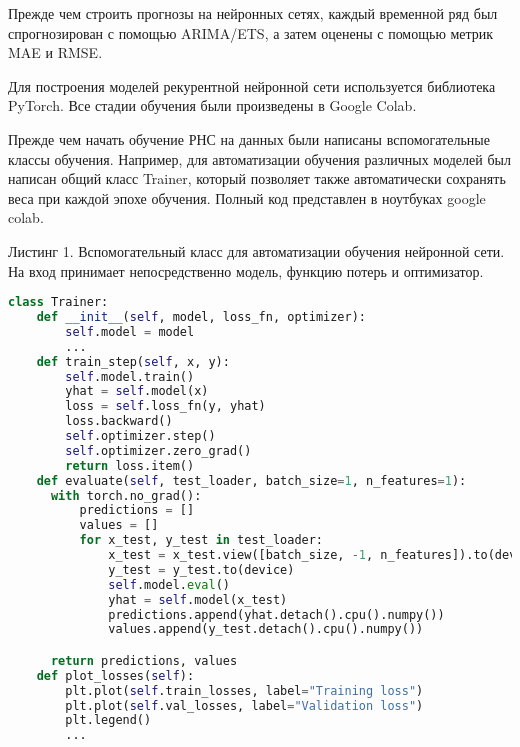\documentclass[12pt, a4paper]{article} %
\begin{document}
Прежде чем строить прогнозы на нейронных сетях, каждый временной ряд был спрогнозирован с помощью ARIMA/ETS, а затем оценены с помощью метрик MAE и RMSE. 

Для построения моделей рекурентной нейронной сети используется библиотека PyTorch. Все стадии обучения были произведены в Google Colab.

Прежде чем начать обучение РНС на данных были написаны вспомогательные классы обучения. Например, для автоматизации обучения различных моделей был написан общий класс Trainer, который позволяет также автоматически сохранять веса при каждой эпохе обучения. Полный код представлен в ноутбуках google colab.
\newpage

Листинг 1. Вспомогательный класс для автоматизации обучения нейронной сети. На вход принимает непосредственно модель, функцию потерь и оптимизатор.
\begin{lstlisting}[language=Python]
class Trainer:
    def __init__(self, model, loss_fn, optimizer):
        self.model = model
        ...
    def train_step(self, x, y):
        self.model.train()
        yhat = self.model(x)
        loss = self.loss_fn(y, yhat)
        loss.backward()
        self.optimizer.step()
        self.optimizer.zero_grad()
        return loss.item()
    def evaluate(self, test_loader, batch_size=1, n_features=1):
      with torch.no_grad():
          predictions = []
          values = []
          for x_test, y_test in test_loader:
              x_test = x_test.view([batch_size, -1, n_features]).to(device)
              y_test = y_test.to(device)
              self.model.eval()
              yhat = self.model(x_test)
              predictions.append(yhat.detach().cpu().numpy())
              values.append(y_test.detach().cpu().numpy())

      return predictions, values
    def plot_losses(self):
        plt.plot(self.train_losses, label="Training loss")
        plt.plot(self.val_losses, label="Validation loss")
        plt.legend()
        ...
\end{lstlisting}
\end{document}
